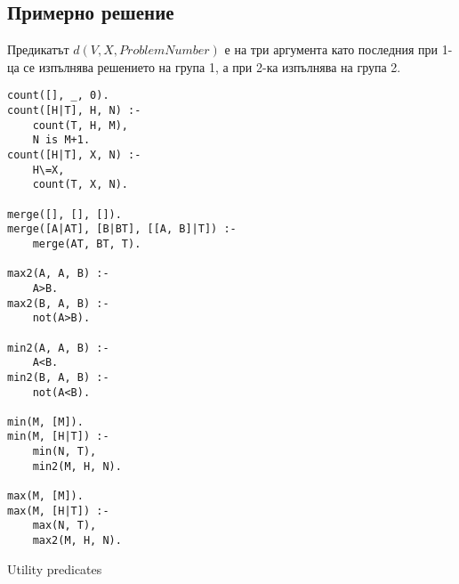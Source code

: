 \documentclass{article}
\newenvironment{longlisting}{\captionsetup{type=listing}}{}
\begin{document}
\subsection{Примерно решение}
Предикатът $d(V, X, ProblemNumber)$ е на три аргумента като последния при 1-ца се изпълнява решението на група 1, а при 2-ка изпълнява на група 2.
\renewcommand{\figurename}{Listing}
  \begin{longlisting}
  \begin{verbatim}
count([], _, 0).
count([H|T], H, N) :-
    count(T, H, M),
    N is M+1.
count([H|T], X, N) :-
    H\=X,
    count(T, X, N). 

merge([], [], []).
merge([A|AT], [B|BT], [[A, B]|T]) :-
    merge(AT, BT, T).

max2(A, A, B) :-
    A>B.
max2(B, A, B) :-
    not(A>B).

min2(A, A, B) :-
    A<B.
min2(B, A, B) :-
    not(A<B).

min(M, [M]).
min(M, [H|T]) :-
    min(N, T),
    min2(M, H, N).

max(M, [M]).
max(M, [H|T]) :-
    max(N, T),
    max2(M, H, N).
\end{verbatim}
 \caption{Utility predicates}
\label{lst:secondListing}
\end{longlisting}
\end{document}
